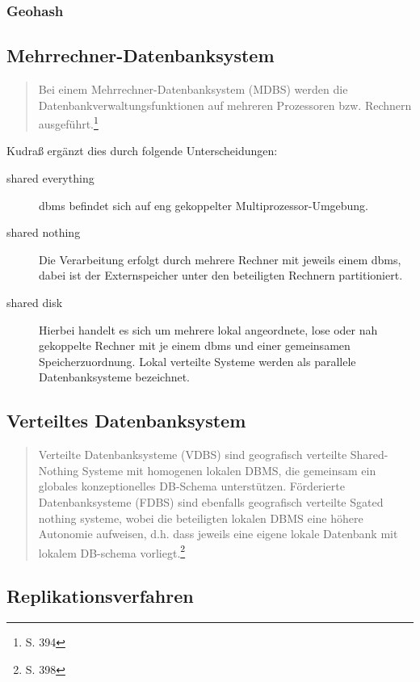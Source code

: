 \subsubsection{Geohash}
\label{geohash}

\subsection{Mehrrechner-Datenbanksystem}

\begin{quote}
Bei einem Mehrrechner-Datenbanksystem (MDBS) werden die Datenbankverwaltungsfunktionen auf mehreren Prozessoren bzw. Rechnern ausgeführt.\footnote{\cite{book:kudrass} S. 394}
\end{quote}
Kudraß ergänzt dies durch folgende Unterscheidungen:
\begin{description}
\item[shared everything] \Gls{dbms} befindet sich auf eng gekoppelter Multiprozessor-Umgebung.
\item[shared nothing] Die Verarbeitung erfolgt durch mehrere Rechner mit jeweils einem \Gls{dbms}, dabei ist der Externspeicher unter den beteiligten Rechnern partitioniert.
\item[shared disk] Hierbei handelt es sich um mehrere lokal angeordnete, lose oder nah gekoppelte Rechner mit je einem \Gls{dbms} und einer gemeinsamen Speicherzuordnung. Lokal verteilte Systeme werden als parallele Datenbanksysteme bezeichnet.
\end{description}

\subsection{Verteiltes Datenbanksystem}

\begin{quote}
Verteilte Datenbanksysteme (VDBS) sind geografisch verteilte Shared-Nothing Systeme mit homogenen lokalen DBMS, die gemeinsam ein globales konzeptionelles DB-Schema unterstützen.
Förderierte Datenbanksysteme (FDBS) sind ebenfalls geografisch verteilte Sgated nothing systeme, wobei die beteiligten lokalen DBMS eine höhere Autonomie aufweisen, d.h. dass jeweils eine eigene lokale Datenbank mit lokalem DB-schema vorliegt.\footnote{\cite{book:kudrass} S. 398}
\end{quote}

\subsection{Replikationsverfahren}

